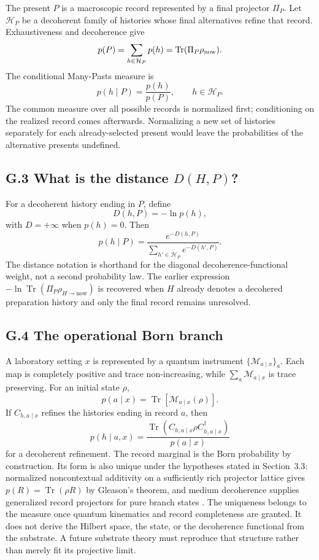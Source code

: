 \documentclass[11pt]{article}
\begin{document}
The present $P$ is a macroscopic record represented by a final projector $\Pi_P$. Let $\mathcal H_P$ be a decoherent family of histories whose final alternatives refine that record. Exhaustiveness and decoherence give
\[
p(P)=\sum_{h\in\mathcal H_P}p(h)
=\operatorname{Tr}(\Pi_P\rho_{\rm now}).
\]
The conditional Many-Pasts measure is
\[
\boxed{
p(h\mid P)=\frac{p(h)}{p(P)},
\qquad h\in\mathcal H_P.
}
\]
The common measure over all possible records is normalized first; conditioning on the realized record comes afterwards. Normalizing a new set of histories separately for each already-selected present would leave the probabilities of the alternative presents undefined.

\subsection*{G.3 What is the distance $D(H,P)$?}

For a decoherent history ending in $P$, define
\[
D(h,P)=-\ln p(h),
\]
with $D=+\infty$ when $p(h)=0$. Then
\[
p(h\mid P)=\frac{e^{-D(h,P)}}{\sum_{h'\in\mathcal H_P}e^{-D(h',P)}}.
\]
The distance notation is shorthand for the diagonal decoherence-functional weight, not a second probability law. The earlier expression $-\ln\operatorname{Tr}(\Pi_P\rho_{H\to\mathrm{now}})$ is recovered when $H$ already denotes a decohered preparation history and only the final record remains unresolved.

\subsection*{G.4 The operational Born branch}

A laboratory setting $x$ is represented by a quantum instrument $\{\mathcal M_{a\mid x}\}_a$. Each map is completely positive and trace non-increasing, while $\sum_a\mathcal M_{a\mid x}$ is trace preserving. For an initial state $\rho$,
\[
p(a\mid x)=\operatorname{Tr}\!\left[\mathcal M_{a\mid x}(\rho)\right].
\]
If $C_{h,a\mid x}$ refines the histories ending in record $a$, then
\[
p(h\mid a,x)=
\frac{\operatorname{Tr}(C_{h,a\mid x}\rho C_{h,a\mid x}^\dagger)}{p(a\mid x)}
\]
for a decoherent refinement. The record marginal is the Born probability by construction. Its form is also unique under the hypotheses stated in Section~3.3: normalized noncontextual additivity on a sufficiently rich projector lattice gives $p(R)=\operatorname{Tr}(\rho R)$ by Gleason's theorem, and medium decoherence supplies generalized record projectors for pure branch states \citep{Gleason1957,Hartle2016}. The uniqueness belongs to the measure once quantum kinematics and record completeness are granted. It does not derive the Hilbert space, the state, or the decoherence functional from the substrate. A future substrate theory must reproduce that structure rather than merely fit its projective limit.
\end{document}
